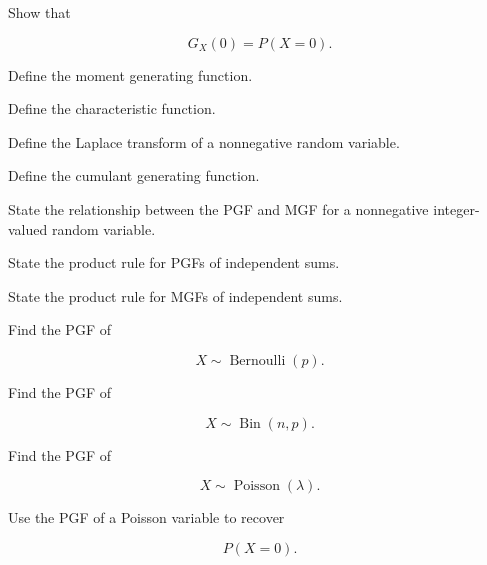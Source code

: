 \begin{exercise}[1]
Show that

\[
G_X(0)=P(X=0).
\]
\end{exercise}

\begin{exercise}[1]
Define the moment generating function.
\end{exercise}

\begin{exercise}[1]
Define the characteristic function.
\end{exercise}

\begin{exercise}[1]
Define the Laplace transform of a nonnegative random variable.
\end{exercise}

\begin{exercise}[1]
Define the cumulant generating function.
\end{exercise}

\begin{exercise}[1]
State the relationship between the PGF and MGF for a nonnegative
integer-valued random variable.
\end{exercise}

\begin{exercise}[1]
State the product rule for PGFs of independent sums.
\end{exercise}

\begin{exercise}[1]
State the product rule for MGFs of independent sums.
\end{exercise}

\begin{exercise}[2]
Find the PGF of

\[
X\sim\operatorname{Bernoulli}(p).
\]
\end{exercise}

\begin{exercise}[2]
Find the PGF of

\[
X\sim\operatorname{Bin}(n,p).
\]
\end{exercise}

\begin{exercise}[2]
Find the PGF of

\[
X\sim\operatorname{Poisson}(\lambda).
\]
\end{exercise}

\begin{exercise}[2]
Use the PGF of a Poisson variable to recover

\[
P(X=0).
\]
\end{exercise}

